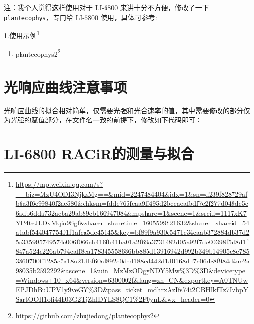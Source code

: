 \documentclass[
]{krantz}
\makeatletter
\newenvironment{Shaded}{\begin{snugshade}}{\end{snugshade}}
\newcommand{\NormalTok}[1]{#1}
\newcommand{\OtherTok}[1]{\textcolor[rgb]{0.56,0.35,0.01}{#1}}
\newcommand{\SpecialCharTok}[1]{\textcolor[rgb]{0.00,0.00,0.00}{#1}}
\providecommand{\tightlist}{%
  \setlength{\itemsep}{0pt}\setlength{\parskip}{0pt}}
\renewenvironment{quote}{\begin{VF}}{\end{VF}}
\renewcommand{\href}[2]{#2\footnote{\url{#1}}}
\newenvironment{kframe}{%
\medskip{}
\setlength{\fboxsep}{.8em}
 \def\at@end@of@kframe{}%
 \ifinner\ifhmode%
  \def\at@end@of@kframe{\end{minipage}}%
  \begin{minipage}{\columnwidth}%
 \fi\fi%
 \def\FrameCommand##1{\hskip\@totalleftmargin \hskip-\fboxsep
 \colorbox{shadecolor}{##1}\hskip-\fboxsep
     \hskip-\linewidth \hskip-\@totalleftmargin \hskip\columnwidth}%
 \MakeFramed {\advance\hsize-\width
   \@totalleftmargin\z@ \linewidth\hsize
   \@setminipage}}%
 {\par\unskip\endMakeFramed%
 \at@end@of@kframe}
\renewenvironment{Shaded}{\begin{kframe}}{\end{kframe}}
\makeatother
\begin{document}
\begin{quote}
注：我个人觉得这样使用对于 LI-6800 来讲十分不方便，修改了一下 \texttt{plantecophys}，专门给 LI-6800 使用，具体可参考:
\end{quote}

1.\href{https://mp.weixin.qq.com/s?__biz=MzU4ODI3NjkzMg==\&mid=2247484404\&idx=1\&sn=d239f828729afb6a3f6e99840f2ae580\&chksm=fdde765fcaa9ff495d2bccaeafbdf7e2f277d049dc5c6adb6dda732acba29ab89cb166947084\&mpshare=1\&scene=1\&srcid=1117xK7YP4teJLDvMqin9Sgf\&sharer_sharetime=1605599821632\&sharer_shareid=54a1abf54404775401f1afca5de45145\&key=bf89f9a930e5471c34caab372884db37d25c335995749574e006f066cb416fb41ba01a2f69a3731482d05a92f7dc00398f5d8d1f847a524e226ab794caff8ea178345558686bb885d13916942d992b349b14905c8e7853860700ff1285c5a18a21dbf60af892e0ded188ed442d1d0168dd7c06de8f984d4ae2a98035b2592292\&ascene=1\&uin=MzMzODgyNDY5Mw\%3D\%3D\&devicetype=Windows+10+x64\&version=6300002f\&lang=zh_CN\&exportkey=A0TNUwEPJDhBuUPV1y9veGY\%3D\&pass_ticket=mdhrxAzIfs74t2CBHIkfTz7IvbpYSartOOH1ofi44h03G2TjZhlDYLS8QC1\%2F0ynL\&wx_header=0}{使用示例}

\begin{enumerate}
\def\labelenumi{\arabic{enumi}.}
\setcounter{enumi}{1}
\tightlist
\item
  \href{https://github.com/zhujiedong/plantecophys2}{plantecophys2}
\end{enumerate}

\hypertarget{notice}{%
\section{光响应曲线注意事项}\label{notice}}

光响应曲线的拟合相对简单，仅需要光强和光合速率的值，其中需要修改的部分仅为光强的赋值部分，在文件名一致的前提下，修改如下代码即可：

\begin{Shaded}
\end{Shaded}

\cleardoublepage

\hypertarget{racir68}{%
\section{\texorpdfstring{LI-6800 RACiR\texttrademark 的测量与拟合}{LI-6800 RACiR的测量与拟合}}\label{racir68}}
\end{document}
